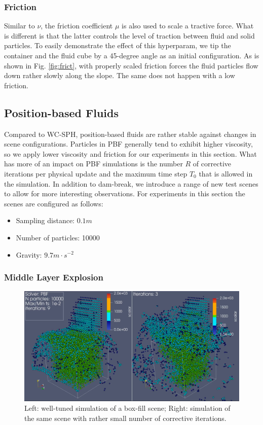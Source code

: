 \documentclass[
	11pt, 
	DIV10,
	ngerman,
	a4paper, 
	oneside, 
	headings=normal, 
	captions=tableheading,
	final, 
	numbers=noenddot
]{scrartcl}
\begin{document}
\subsubsection{Friction}

Similar to $ \nu $, the friction coefficient $ \mu $ is also used to scale a tractive force. What is different is that the latter controls the level of traction between fluid and solid particles. To easily demonstrate the effect of this hyperparam, we tip the container and the fluid cube by a 45-degree angle as an initial configuration. As is shown in Fig. \ref{fig:frict}, with properly scaled friction forces the fluid particles flow down rather slowly along the slope. The same does not happen with a low friction.

\subsection{Position-based Fluids}

Compared to WC-SPH, position-based fluids are rather stable against changes in scene configurations. Particles in PBF generally tend to exhibit higher viscosity, so we apply lower viscosity and friction for our experiments in this section. What has more of an impact on PBF simulations is the number $ R $ of corrective iterations per physical update and the maximum time step $ T_{0} $ that is allowed in the simulation. In addition to dam-break, we introduce a range of new test scenes to allow for more interesting observations. For experiments in this section the scenes are configured as follows:

\begin{itemize}
    \item Sampling distance: $ 0.1m $
    \item Number of particles: 10000
    \item Gravity: $ 9.7m \cdot s^{-2} $
\end{itemize}

\subsubsection{Middle Layer Explosion}

\begin{figure}
    \centering
    \includegraphics[width=.6\textwidth]{pics/pbf_iter.png}
    \caption{Left: well-tuned simulation of a box-fill scene; Right: simulation of the same scene with rather small number of corrective iterations.}
    \label{fig:boxfill}
\end{figure}
\end{document}
